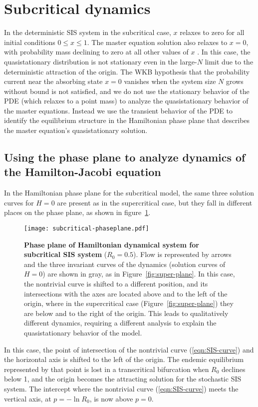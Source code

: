 \documentclass[review]{elsarticle}
\begin{document}
\section{Subcritical dynamics}

In the deterministic SIS system in the subcritical case,
$x$ relaxes to zero for all initial conditions $0\leq x\leq1$.  
The master equation solution also relaxes to $x=0$,
with probability mass declining to zero at all other values of $x$
\cite{nasell_quasi-stationary_1996}.
In this case, the quasistationary distribution is not stationary even
in the large-$N$ limit
due to the deterministic attraction of the origin.
The WKB hypothesis that the probability current near the
absorbing state $x=0$ vanishes when the system size $N$ grows
without bound is not satisfied, and we do not use the stationary
behavior of the PDE (which relaxes to a point mass) to analyze
the quasistationary behavior of the master equations.
Instead we use the transient behavior of the PDE to identify
the equilibrium structure in the Hamiltonian phase plane that
describes the master equation's quasistationary solution.

\subsection{Using the phase plane to analyze dynamics of the Hamilton-Jacobi equation}

In the Hamiltonian phase plane for the subcritical model,
the same three solution curves for $H=0$ are present as in the
supercritical case, but
they fall in different places on the phase plane, as shown in
figure~\ref{fig:sub-plane}.
\begin{figure}
\centering
\texttt{[image: subcritical-phaseplane.pdf]}
\caption{ \label{fig:sub-plane}
{\bf Phase plane of Hamiltonian dynamical system for subcritical SIS system} ($R_0=0.5$).
Flow is represented by arrows and the three invariant curves of the dynamics
(solution curves of $H=0$) are shown in gray, as in Figure~\ref{fig:super-plane}.
In this case, the nontrivial curve is shifted to a different position,
and its intersections with the axes are located above and to the
left of the origin, where in the supercritical case (Figure~\ref{fig:super-plane})
they are below and to the right of the origin.
This leads to qualitatively different dynamics,
requiring a different analysis to explain the quasistationary
behavior of the model.
}
\end{figure}
In this case, the point of intersection of
the nontrivial curve (\ref{eqn:SIS-curve}) and the horizontal axis
is shifted to the left of the origin.
The endemic equilibrium represented by that point is lost
in a transcritical bifurcation when
$R_0$ declines below 1, and the origin becomes the attracting
solution for the stochastic SIS system.
The intercept where the nontrivial curve (\ref{eqn:SIS-curve})
meets the vertical axis,
at $p=-\ln R_0$, is now above $p=0$. 
\end{document}
